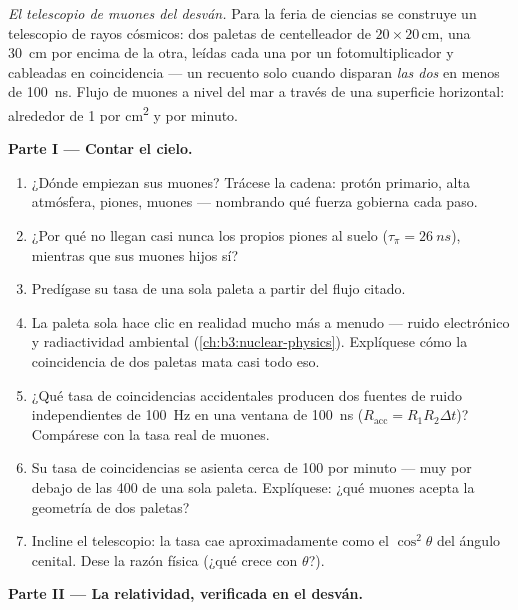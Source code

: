 \begin{problem}\label{pb:b3:particle-physics:1}
\emph{El telescopio de muones del desván.} Para la feria de ciencias se construye un
telescopio de rayos cósmicos: dos paletas de centelleador de $20\times20$\,\unit{cm},
una \qty{30}{cm} por encima de la otra, leídas cada una por un fotomultiplicador y
cableadas en coincidencia --- un recuento solo cuando disparan \emph{las dos}
en menos de \qty{100}{ns}. Flujo de muones a nivel del mar a través de una superficie
horizontal: alrededor de 1 por \unit{cm^2} y por minuto.

\medskip\noindent\textbf{Parte I --- Contar el cielo.}

\begin{enumerate}
  \item ¿Dónde empiezan sus muones? Trácese la cadena: protón
        primario, alta atmósfera, piones, muones --- nombrando qué
        fuerza gobierna cada paso.
  \item ¿Por qué no llegan casi nunca los propios piones al
        suelo ($\tau_\pi = \qty{26}{ns}$), mientras que sus muones
        hijos sí?
  \item Predígase su tasa de una sola paleta a partir del flujo citado.
  \item La paleta sola hace clic en realidad mucho más a menudo ---
        ruido electrónico y radiactividad ambiental
        (\cref{ch:b3:nuclear-physics}). Explíquese cómo la
        coincidencia de dos paletas mata casi todo eso.
  \item ¿Qué tasa de coincidencias accidentales producen dos fuentes de
        ruido independientes de \qty{100}{Hz} en una ventana de \qty{100}{ns}
        ($R_{\text{acc}} = R_1R_2\Delta t$)? Compárese con
        la tasa real de muones.
  \item Su tasa de coincidencias se asienta cerca de 100 por minuto ---
        muy por debajo de las 400 de una sola paleta. Explíquese: ¿qué muones
        acepta la geometría de dos paletas?
  \item Incline el telescopio: la tasa cae aproximadamente como el
        $\cos^2\theta$ del ángulo cenital. Dese la razón
        física (¿qué crece con $\theta$?).
\end{enumerate}

\medskip\noindent\textbf{Parte II --- La relatividad, verificada en el desván.}


\end{problem}
